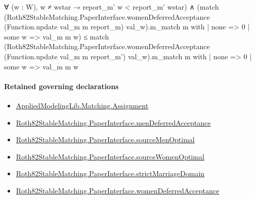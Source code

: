 \documentclass[10pt]{article}
\begin{document}
\begin{ReviewVerbatim}
                          ∀ (w : W), w ≠ wstar → report_m' w < report_m' wstar) ∧
                      (match
                          (Roth82StableMatching.PaperInterface.womenDeferredAcceptance
                                (Function.update val_m m report_m) val_w).m_match
                            m with
                        | none => 0
                        | some w => val_m m w) ≤
                        match
                          (Roth82StableMatching.PaperInterface.womenDeferredAcceptance
                                (Function.update val_m m report_m') val_w).m_match
                            m with
                        | none => 0
                        | some w => val_m m w
\end{ReviewVerbatim}

\paragraph{Retained governing declarations}
\begin{itemize}\raggedright
\item \hyperlink{governing-declaration-508c084086b006b8}{Applied\allowbreak{}Modeling\allowbreak{}Lib.\allowbreak{}Matching.\allowbreak{}Assignment}
\item \hyperlink{governing-declaration-7357e0557237bc7e}{Roth82\allowbreak{}Stable\allowbreak{}Matching.\allowbreak{}Paper\allowbreak{}Interface.\allowbreak{}men\allowbreak{}Deferred\allowbreak{}Acceptance}
\item \hyperlink{paper-prerequisite-44aa864d4a515095}{Roth82\allowbreak{}Stable\allowbreak{}Matching.\allowbreak{}Paper\allowbreak{}Interface.\allowbreak{}source\allowbreak{}Men\allowbreak{}Optimal}
\item \hyperlink{paper-prerequisite-6c23e95d9facee8d}{Roth82\allowbreak{}Stable\allowbreak{}Matching.\allowbreak{}Paper\allowbreak{}Interface.\allowbreak{}source\allowbreak{}Women\allowbreak{}Optimal}
\item \hyperlink{governing-declaration-d06ec2a2987f0c72}{Roth82\allowbreak{}Stable\allowbreak{}Matching.\allowbreak{}Paper\allowbreak{}Interface.\allowbreak{}strict\allowbreak{}Marriage\allowbreak{}Domain}
\item \hyperlink{governing-declaration-13c08a3bc523499b}{Roth82\allowbreak{}Stable\allowbreak{}Matching.\allowbreak{}Paper\allowbreak{}Interface.\allowbreak{}women\allowbreak{}Deferred\allowbreak{}Acceptance}
\end{itemize}
\end{document}
